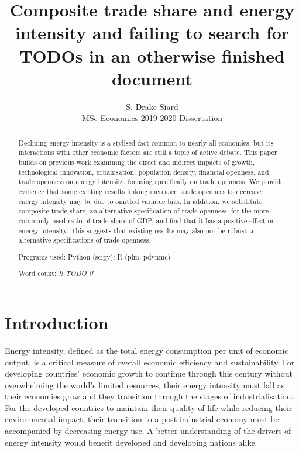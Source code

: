 \documentclass[12pt,a4paper]{article}
\title{Composite trade share and energy intensity and failing to search for TODOs in an otherwise finished document}
\author{S. Drake Siard\\
MSc Economics 2019-2020 Dissertation}
\date{}
\newcommand{\pkg}[1]{{\fontseries{b}\selectfont #1}}
\begin{document}
\maketitle

\begin{abstract}
Declining energy intensity is a stylised fact common to nearly all economies, but its interactions with other economic factors are still a topic of active debate.
This paper builds on previous work examining the direct and indirect impacts of growth, technological innovation, urbanisation, population density, financial openness, and trade openness on energy intensity, focusing specifically on trade openness. 
We provide evidence that some existing results linking increased trade openness to decreased energy intensity may be due to omitted variable bias.
In addition, we substitute composite trade share, an alternative specification of trade openness, for the more commonly used ratio of trade share of GDP, and find that it has a positive effect on energy intensity.
This suggests that existing results may also not be robust to alternative specifications of trade openness.

Programs used: Python (\pkg{scipy}); R (\pkg{plm}, \pkg{pdynmc})

Word count: \emph{!! TODO !!}
 
\end{abstract}

\pagebreak

\tableofcontents

\pagebreak

\listoffigures
\listoftables

\pagebreak

\section{Introduction}\label{sec:introduction}

Energy intensity, defined as the total energy consumption per unit of economic output, is a critical measure of overall economic efficiency and sustainability.
For developing countries' economic growth to continue through this century without overwhelming the world's limited resources, their energy intensity must fall as their economies grow and they transition through the stages of industrialisation.
For the developed countries to maintain their quality of life while reducing their environmental impact, their transition to a post-industrial economy must be accompanied by decreasing energy use.
A better understanding of the drivers of energy intensity would benefit developed and developing nations alike.
\end{document}
